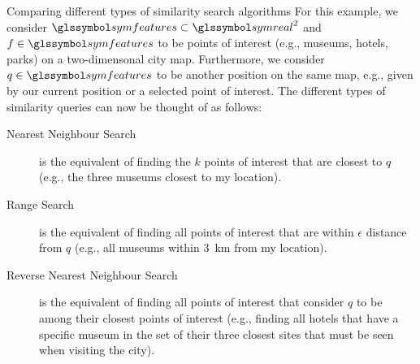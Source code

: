 \begin{example}[label=example:similarity_search]{Comparing different types of similarity search algorithms}{}
    For this example, we consider $\symfeatures \subset \symreal^2$ and $f \in \symfeatures$ to be points of interest (e.g., museums, hotels, parks) on a two-dimensonal city map. Furthermore, we consider $q \in \symfeatures$ to be another position on the same map, e.g., given by our current position or a selected point of interest. The different types of similarity queries can now be thought of as follows:

    \begin{description}
        \item[Nearest Neighbour Search] is the equivalent of finding the $k$ points of interest that are closest to $q$ (e.g., the three museums closest to my location).
        \item[Range Search] is the equivalent of finding all points of interest that are within $\epsilon$ distance from  $q$ (e.g., all museums within \SI{3}{km} from my location).
        \item[Reverse Nearest Neighbour Search] is the equivalent of finding all points of interest that consider $q$ to be among their closest points of interest (e.g., finding all hotels that have a specific museum in the set of their three closest sites that must be seen when visiting the city).
    \end{description}
\end{example}

